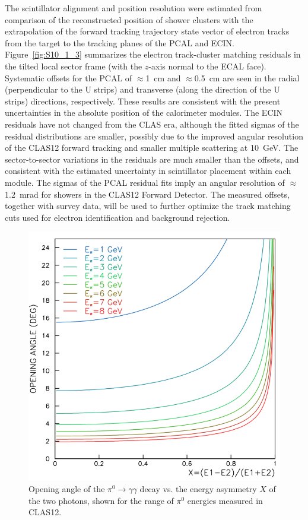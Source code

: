 The scintillator alignment and position resolution were estimated from comparison of the reconstructed position of
shower clusters with the extrapolation of the forward tracking trajectory state vector of electron tracks from the
target to the tracking planes of the PCAL and ECIN. Figure~\ref{fig:S10_1_3} summarizes the electron
track-cluster matching residuals in the tilted local sector frame (with the $z$-axis normal to the ECAL face).
Systematic offsets for the PCAL of $\approx$1~cm and $\approx$0.5~cm are seen in the radial (perpendicular to
the U strips) and transverse (along the direction of the U strips) directions, respectively. These results are
consistent with the present uncertainties in the absolute position of the calorimeter modules. The ECIN residuals
have not changed from the CLAS era, although the fitted sigmas of the residual distributions are smaller, possibly
due to the improved angular resolution of the CLAS12 forward tracking and smaller multiple scattering at 10~GeV.
The sector-to-sector variations in the residuals are much smaller than the offsets, and consistent with the
estimated uncertainty in scintillator placement within each module. The sigmas of the PCAL residual fits imply an
angular resolution of $\approx$1.2~mrad for showers in the CLAS12 Forward Detector. The measured offsets,
together with survey data, will be used to further optimize the track matching cuts used for electron identification
and background rejection. 

\begin{figure}[t]
\centering
\includegraphics[width=0.7\columnwidth,keepaspectratio]{img/opa.png}
\caption[]{Opening angle of the $\pi^0 \to \gamma \gamma$ decay vs. the energy asymmetry $X$ of
  the two photons, shown for the range of $\pi^0$ energies measured in CLAS12.}
\label{fig:opa}
\end{figure}

